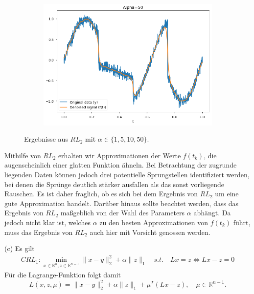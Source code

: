 \documentclass[ngerman, a4paper,12pt]{article}
\begin{document}
\begin{figure}[h]
\begin{subfigure}[b]{0.45\textwidth}
		\label{2a10}
	\end{subfigure}
	\begin{subfigure}[b]{0.45\textwidth}
		\includegraphics[width=1\columnwidth]{Images/2a50.png}
		\label{2a50}
	\end{subfigure}
	\caption{Ergebnisse aus $RL_2$ mit $\alpha \in \{1, 5, 10, 50\}$.}
	\vspace{-20pt}
\end{figure}
Mithilfe von $RL_2$ erhalten wir Approximationen der Werte $f(t_k)$, die augenscheinlich einer glatten Funktion ähneln. Bei Betrachtung der zugrunde liegenden Daten können jedoch drei potentielle Sprungstellen identifiziert werden, bei denen die Sprünge deutlich stärker ausfallen als das sonst vorliegende Rauschen. Es ist daher fraglich, ob es sich bei dem Ergebnis von $RL_2$ um eine gute Approximation handelt. Darüber hinaus sollte beachtet werden, dass das Ergebnis von $RL_2$ maßgeblich von der Wahl des Parameters $\alpha$ abhängt. Da jedoch nicht klar ist, welches $\alpha$ zu den besten Approximationen von $f(t_k)$ führt, muss das Ergebnis von $RL_2$ auch hier mit Vorsicht genossen werden.
\par
(c) Es gilt
\begin{equation*}
	\begin{split}
	CRL_1: \min_{x\in\mathbb R^n,z \in \mathbb{R}^{n-1}}\|x-y\|_2^2+\alpha\|z\|_1 \quad s.t. \quad Lx = z \Leftrightarrow Lx - z=0
	\end{split}
\end{equation*}
Für die Lagrange-Funktion folgt damit
\begin{equation}
\label{eq:lagrange}
L(x,z,\mu)=\|x-y\|_2^2+\alpha \|z\|_1+\mu^T(Lx - z), \quad \mu \in \mathbb{R}^{n-1}.
\end{equation}
\end{document}
